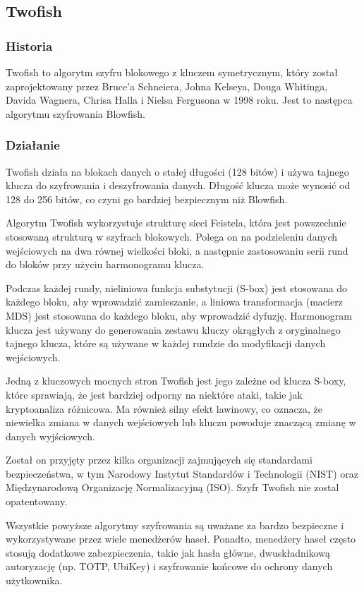 \subsection{Twofish}
\subsubsection{Historia}
Twofish to algorytm szyfru blokowego z kluczem symetrycznym, który został zaprojektowany przez Bruce'a Schneiera, Johna Kelseya, Douga Whitinga, Davida Wagnera, Chrisa Halla i Nielsa Fergusona w 1998 roku. Jest to następca algorytmu szyfrowania Blowfish.
\subsubsection{Działanie}
Twofish działa na blokach danych o stałej długości (128 bitów) i używa tajnego klucza do szyfrowania i deszyfrowania danych. Długość klucza może wynosić od 128 do 256 bitów, co czyni go bardziej bezpiecznym niż Blowfish.

Algorytm Twofish wykorzystuje strukturę sieci Feistela, która jest powszechnie stosowaną strukturą w szyfrach blokowych. Polega on na podzieleniu danych wejściowych na dwa równej wielkości bloki, a następnie zastosowaniu serii rund do bloków przy użyciu harmonogramu klucza.

Podczas każdej rundy, nieliniowa funkcja substytucji (S-box) jest stosowana do każdego bloku, aby wprowadzić zamieszanie, a liniowa transformacja (macierz MDS) jest stosowana do każdego bloku, aby wprowadzić dyfuzję. Harmonogram klucza jest używany do generowania zestawu kluczy okrągłych z oryginalnego tajnego klucza, które są używane w każdej rundzie do modyfikacji danych wejściowych.

Jedną z kluczowych mocnych stron Twofish jest jego zależne od klucza S-boxy, które sprawiają, że jest bardziej odporny na niektóre ataki, takie jak kryptoanaliza różnicowa. Ma również silny efekt lawinowy, co oznacza, że niewielka zmiana w danych wejściowych lub kluczu powoduje znaczącą zmianę w danych wyjściowych.

Został on przyjęty przez kilka organizacji zajmujących się standardami bezpieczeństwa, w tym Narodowy Instytut Standardów i Technologii (NIST) oraz Międzynarodową Organizację Normalizacyjną (ISO). Szyfr Twofish nie zostal opatentowany. 


Wszystkie powyższe algorytmy szyfrowania są uważane za bardzo bezpieczne i wykorzystywane przez wiele menedżerów haseł. Ponadto, menedżery haseł często stosują dodatkowe zabezpieczenia, takie jak hasła główne, dwuskładnikową autoryzację (np. TOTP, UbiKey) i szyfrowanie końcowe do ochrony danych użytkownika.

